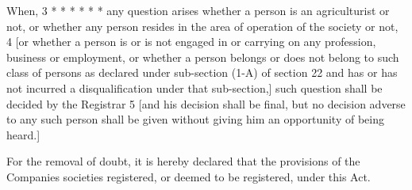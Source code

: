 \documentclass[reprint]{mhact}
\begin{document}


    When, 3 * * * * * * any question arises whether a person is an
    agriculturist or not, or whether any person resides in the area of
    operation of the society or not, 4 [or whether a person is or is
    not engaged in or carrying on any profession, business or
    employment, or whether a person belongs or does not belong to such
    class of persons as declared under sub-section (1-A) of section 22
    and has or has not incurred a disqualification under that
    sub-section,] such question shall be decided by the Registrar 5
    [and his decision shall be final, but no decision adverse to any
    such person shall be given without giving him an opportunity of
    being heard.]





     For the removal of
    doubt, it is hereby declared that the provisions of the Companies
    societies registered, or deemed to be registered, under this Act.

    
\end{document}
